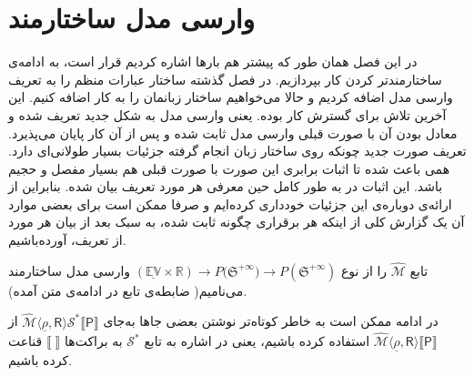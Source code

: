 \chapter{وارسی مدل ساختارمند}

در این فصل همان طور که پیشتر هم بارها اشاره کردیم قرار است، به ادامه‌ی ساختارمندتر کردن کار بپردازیم. در فصل گذشته ساختار عبارات منظم را به تعریف وارسی مدل اضافه کردیم و حالا می‌خواهیم ساختار زبانمان را به کار اضافه کنیم. این آخرین تلاش \cite{calcul} برای گسترش کار بوده. یعنی وارسی مدل به شکل جدید تعریف شده و معادل بودن آن با صورت قبلی وارسی مدل ثابت شده و پس از آن کار پایان می‌پذیرد. 
تعریف صورت جدید چونکه روی ساختار زبان انجام گرفته جزئیات بسیار طولانی‌ای دارد. همی باعث شده تا اثبات‌ برابری این صورت با صورت قبلی هم بسیار مفصل و حجیم باشد. این اثبات در \cite{calcul} به طور کامل حین معرفی هر مورد تعریف بیان شده. بنابراین از ارائه‌ی دوباره‌ی این جزئیات خودداری کرده‌ایم و صرفا ممکن است برای بعضی موارد آن یک گزارش کلی از اینکه هر برقراری چگونه ثابت شده، به سبک \cite{calcul} بعد از بیان هر مورد از تعریف، آورده‌باشیم.

\begin{defn}
	
تابع
$\mathcal{\hat{M}}$
 را از نوع
 $\mathbb{(\underline{EV} \times R)} \rightarrow  \mathit{P}({\mathfrak{S}^{+\infty})}
\rightarrow \mathit{P}(\mathfrak{S}^{+\infty} ) $
وارسی مدل ساختارمند می‌نامیم( ضابطه‌ی تابع در ادامه‌ی متن آمده).
\end{defn}
در ادامه ممکن است به خاطر کوتاه‌تر نوشتن بعضی جاها به‌جای 
$\mathcal{\hat{M}}\langle \underline{\rho}, \mathsf{R} \rangle \mathcal{S}^* \llbracket \mathsf{P} \rrbracket$
از 
$\mathcal{\hat{M}}\langle \underline{\rho}, \mathsf{R} \rangle \llbracket \mathsf{P} \rrbracket$
استفاده کرده باشیم، یعنی در اشاره به تابع $\mathcal{S}^*$ به براکت‌ها
$\llbracket \; \rrbracket$
قناعت کرده باشیم.


